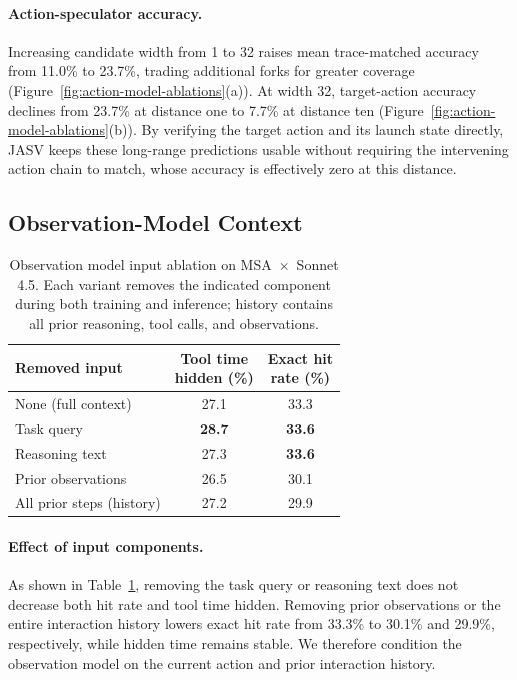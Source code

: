 \paragraph{Action-speculator accuracy.}
Increasing candidate width from 1 to 32 raises mean trace-matched accuracy
from 11.0\% to 23.7\%, trading additional forks for greater coverage
(Figure~\ref{fig:action-model-ablations}(a)). At width 32, target-action
accuracy declines from 23.7\% at distance one to 7.7\% at distance ten
(Figure~\ref{fig:action-model-ablations}(b)). By verifying the target action
and its launch state directly, JASV keeps these long-range predictions usable
without requiring the intervening action chain to match, whose accuracy is
effectively zero at this distance.

\subsection{Observation-Model Context}

\begin{table}[t]
\centering
\small
\setlength{\tabcolsep}{5pt}
\caption{Observation model input ablation on MSA~$\times$~Sonnet 4.5. Each variant removes the indicated component during both training and inference; history contains all prior reasoning, tool calls, and observations.}
\label{tab:observation-input-ablation}
\begin{tabular}{@{}lcc@{}}
\toprule
Removed input & \shortstack{Tool time\\hidden (\%)} &
\shortstack{Exact hit\\rate (\%)} \\
\midrule
None (full context)        & 27.1          & 33.3          \\
Task query                 & \textbf{28.7} & \textbf{33.6} \\
Reasoning text             & 27.3          & \textbf{33.6} \\
Prior observations         & 26.5          & 30.1          \\
All prior steps (history)  & 27.2          & 29.9          \\
\bottomrule
\end{tabular}
\end{table}

\paragraph{Effect of input components.}
As shown in Table~\ref{tab:observation-input-ablation}, removing the task query or reasoning text does not decrease both hit rate and tool time hidden.
Removing prior observations or the entire interaction history lowers exact hit rate from 33.3\% to 30.1\% and 29.9\%, respectively, while hidden time remains stable.
We therefore condition the observation model on the current action and
prior interaction history.
